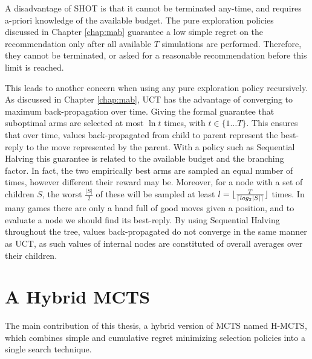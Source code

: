 \documentclass{kecsmstr}
\DeclarePairedDelimiter{\ceil}{\lceil}{\rceil}
\DeclarePairedDelimiter{\floor}{\lfloor}{\rfloor}
\begin{document}
A disadvantage of SHOT is that it cannot be terminated any-time, and requires a-priori knowledge of the available budget. The pure exploration policies discussed in Chapter \ref{chap:mab} guarantee a low simple regret on the recommendation only after all available $T$ simulations are performed. Therefore, they cannot be terminated, or asked for a reasonable recommendation before this limit is reached.

This leads to another concern when using any pure exploration policy recursively. As discussed in Chapter \ref{chap:mab}, UCT has the advantage of converging to maximum back-propagation over time. Giving the formal guarantee that suboptimal arms are selected at most $\ln{t}$ times, with $t\in \{1\dots T\}$. This ensures that over time, values back-propagated from child to parent represent the best-reply to the move represented by the parent. With a policy such as Sequential Halving this guarantee is related to the available budget and the branching factor. In fact, the two empirically best arms are sampled an equal number of times, however different their reward may be. Moreover, for a node with a set of children $S$, the worst $\frac{|S|}{2}$ of these will be sampled at least $l = \floor{\frac{T}{\ceil{log_2{|S|}}}}$ times. In many games there are only a hand full of good moves given a position, and to evaluate a node we should find its best-reply. By using Sequential Halving throughout the tree, values back-propagated do not converge in the same manner as UCT, as such values of internal nodes are constituted of overall averages over their children.

\chapter{A Hybrid MCTS}
\label{chap:hybmcts}
\begin{chaptercontents}
The main contribution of this thesis, a hybrid version of MCTS named H-MCTS, which combines simple and cumulative regret minimizing selection policies into a single search technique.
\end{chaptercontents}
\end{document}
